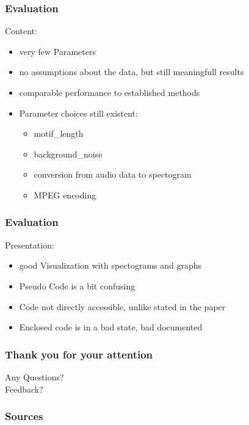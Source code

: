 \documentclass{beamer}
\begin{document}
\begin{frame}
    \frametitle{Evaluation}
    Content:
    \begin{itemize}
        \item very few Parameters
        \item no assumptions about the data, but still meaningfull results
        \item comparable performance to established methods
        \item Parameter choices still existent:
            \begin{itemize}
                \item motif\_length
                \item background\_noise
                \item conversion from audio data to spectogram
                \item MPEG encoding
            \end{itemize}
    \end{itemize}
\end{frame}

\begin{frame}
    \frametitle{Evaluation}
    Presentation:
    \begin{itemize}
        \item good Visualization with spectograms and graphs
        \item Pseudo Code is a bit confusing
        \item Code not directly accessible, unlike stated in the paper
        \item Enclosed code is in a bad state, bad documented
    \end{itemize}
\end{frame}

\begin{frame}
    \frametitle{Thank you for your attention}
    \begin{center}
        Any Questions?\\
        Feedback?
    \end{center}
    
\end{frame}


\begin{frame}
    \frametitle{Sources}
    \nocite{haoparameter}
    \nocite{campana2010compression}
    \nocite{keogh2012monitoring}
    
    
\end{frame}
\end{document}
